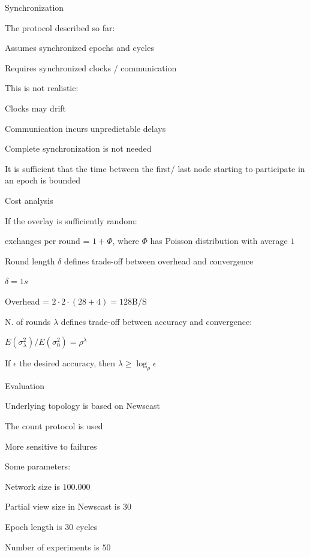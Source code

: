 \begin{frame}{Synchronization}
	
\BIL
\item The protocol described so far:
\BI
\item Assumes synchronized epochs and cycles
\item Requires synchronized clocks / communication
\EI
\item This is not realistic:
\BI
\item Clocks may drift
\item Communication incurs unpredictable delays
\EI
\item Complete synchronization is not needed
\BI
\item It is sufficient that the time between the first/ last node starting to participate in an epoch is bounded
\EI
\EIL

\end{frame}

\begin{frame}{Cost analysis}
	
\BIL
\item If the overlay is sufficiently random:
	\BI
	\item exchanges per round = $1 + \Phi$, where $\Phi$ has Poisson distribution with average $1$
	\EI
\item Round length $\delta$ defines trade-off between overhead and convergence
 	\BI
	\item $\delta = 1s$
	\item Overhead = $2 \cdot 2 \cdot (28+4) = 128$B/S
	\EI
\item N. of rounds $\lambda$ defines trade-off between accuracy and convergence:
	\BI
	\item $E(\sigma^2_\lambda )/E(\sigma_0^2) = \rho^\lambda$
	\item If $\epsilon$ the desired accuracy, then $\lambda \geq \log_\rho \epsilon$
	\EI
\EIL

\end{frame}


\begin{frame}{Evaluation}

\BIL	
\item Underlying topology is based on Newscast
\item The count protocol is used
	\BI
	\item More sensitive to failures
	\EI	
\item Some parameters:
	\BI
	\item Network size is $100.000$
	\item Partial view size in Newscast is $30$
	\item Epoch length is $30$ cycles
	\item Number of experiments is $50$
	\EI
\EIL
\end{frame}

